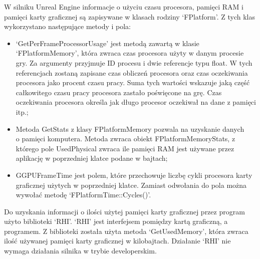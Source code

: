 \documentclass[12pt,twoside]{article}
\begin{document}
W silniku Unreal Engine informacje o użyciu czasu procesora, pamięci RAM i pamięci karty graficznej są zapisywane w klasach rodziny ‘FPlatform’. Z tych klas wykorzystano następujące metody i pola:
\begin{itemize}
\item ‘GetPerFrameProcessorUsage’ jest metodą zawartą w klasie
‘FPlatformMemory’, która zwraca czas procesora użyty w danym procesie gry. Za
argumenty przyjmuje ID procesu i dwie referencje typu float. W tych referencjach
zostaną zapisane czas obliczeń procesora oraz czas oczekiwania procesora jako
procent czasu pracy. Suma tych wartości wskazuje jaką część całkowitego czasu
pracy procesora zastało poświęcone na grę. Czas oczekiwania procesora określa
jak długo procesor oczekiwał na dane z pamięci itp.;
\item Metoda GetStats z klasy FPlatformMemory pozwala na uzyskanie danych\\o
pamięci komputera. Metoda zwraca obiekt FPlatformMemoryStats, z którego pole
UsedPhysical zwraca ile pamięci RAM jest używane przez aplikację w poprzedniej
klatce podane w bajtach;
\item GGPUFrameTime jest polem, które przechowuje liczbę cykli procesora karty
graficznej użytych w poprzedniej klatce. Zamiast odwołania do pola można wywołać
metodę ‘FPlatformTime::Cycles()’.
\end{itemize}
Do uzyskania informacji o ilości użytej pamięci karty graficznej przez program
użyto biblioteki ‘RHI’. ‘RHI’ jest interfejsem pomiędzy kartą graficzną, a
programem. Z biblioteki została użyta metoda ‘GetUsedMemory’, która zwraca ilość
używanej pamięci karty graficznej w kilobajtach. Działanie ‘RHI’ nie wymaga
działania silnika w trybie developerskim. 
\end{document}

